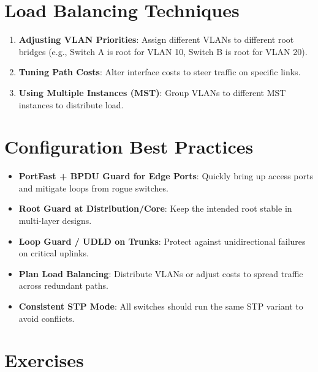 \documentclass[a4paper]{report}
\begin{document}
\section{Load Balancing Techniques}
\begin{enumerate}
    \item \textbf{Adjusting VLAN Priorities}: Assign different VLANs to different root bridges (e.g., Switch A is root for VLAN 10, Switch B is root for VLAN 20).
    \item \textbf{Tuning Path Costs}: Alter interface costs to steer traffic on specific links.
    \item \textbf{Using Multiple Instances (MST)}: Group VLANs to different MST instances to distribute load.
\end{enumerate}

\section{Configuration Best Practices}
\begin{itemize}
    \item \textbf{PortFast + BPDU Guard for Edge Ports}: Quickly bring up access ports and mitigate loops from rogue switches.
    \item \textbf{Root Guard at Distribution/Core}: Keep the intended root stable in multi-layer designs.
    \item \textbf{Loop Guard / UDLD on Trunks}: Protect against unidirectional failures on critical uplinks.
    \item \textbf{Plan Load Balancing}: Distribute VLANs or adjust costs to spread traffic across redundant paths.
    \item \textbf{Consistent STP Mode}: All switches should run the same STP variant to avoid conflicts.
\end{itemize}

\section{Exercises}
\end{document}
